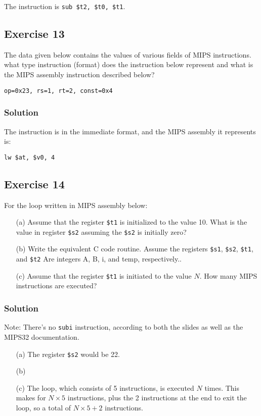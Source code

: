 \documentclass[12pt]{article}
\begin{document}
The instruction is {\tt sub \$t2, \$t0, \$t1}.

\subsection*{Exercise 13}
The data given below contains the values of various fields of MIPS instructions. what type instruction (format) does the instruction below represent and what is the MIPS assembly instruction described below?
\begin{verbatim}
op=0x23, rs=1, rt=2, const=0x4
\end{verbatim}
\subsubsection*{Solution}
The instruction is in the immediate format, and the MIPS assembly it represents is:
\begin{verbatim}
lw $at, $v0, 4
\end{verbatim}

\subsection*{Exercise 14}
For the loop written in MIPS assembly below:
\begin{itemize}
\item[(a)] Assume that the register {\tt\$t1} is initialized to the value 10. What is the value in register {\tt\$s2} assuming the {\tt\$s2} is initially zero?
\item[(b)] Write the equivalent C code routine. Assume the registers {\tt\$s1}, {\tt\$s2}, {\tt\$t1}, and {\tt\$t2} Are integers A, B, i, and temp, respectively..
\item[(c)] Assume that the register {\tt\$t1} is initiated to the value $N$. How many MIPS instructions are executed?
\end{itemize}

\subsubsection*{Solution}
Note: There's no {\tt subi} instruction, according to both the slides as well as the MIPS32 documentation.
\begin{itemize}
\item[(a)] The register {\tt\$s2} would be 22.
\item[(b)] 
\item[(c)] The loop, which consists of 5 instructions, is executed $N$ times. This makes for $N \times 5$ instructions, plus the 2 instructions at the end to exit the loop, so a total of $\boxed{N \times 5 + 2}$ instructions.
\end{itemize}
\end{document}

